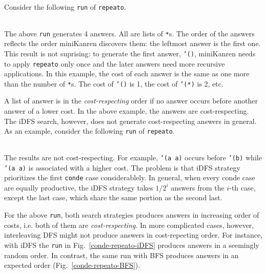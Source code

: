 \documentclass[format=acmlarge, review=true, authordraft=true]{acmart}
\begin{document}
Consider the following \texttt{run} of \texttt{repeato}.
\begin{center}
  \begin{tabular}{c}
  
   \end{tabular}
\end{center}

The above \texttt{run} generates 4 answers. All are lists of \texttt{*}s.
The order of the answers reflects the order miniKanren discovers them:
the leftmost answer is the first one. This result is not suprising:
to generate the first answer, \texttt{'()}, miniKanren needs to apply
\texttt{repeato} only once and the later answers need more recursive
applications. In this example, the cost of each answer is the same as
one more than the number of \texttt{*}s. The cost of \texttt{'()} is 1,
the cost of \texttt{'(*)} is 2, etc.

A list of answer is in the \emph{cost-respecting} order if no answer occurs
before another answer of a lower cost. In the above example, the answers are
cost-respecting. The iDFS search, however, does not generate cost-respecting
answers in general. As an example, consider the following \texttt{run} of
\texttt{repeato}.
\begin{center}
  \begin{tabular}{c}
   
   \end{tabular}
\end{center}

The results are not cost-respecting. For example, \texttt{'(a a)} occurs before
\texttt{'(b)} while \texttt{'(a a)} is associated with a higher cost. 
The problem is that iDFS strategy prioritizes the first \texttt{conde} case
considerablely. In general, when every conde case are equally productive, the iDFS
strategy takes $1/2^{i}$ answers from the $i$-th case, except the last case,
which share the same portion as the second last.




For the above \texttt{run}, both search strategies produces answers in increasing order of costs, i.e. both of them are \emph{cost-respecting}. In more complicated cases, however, interleaving DFS might not produce answers in cost-repecting order. For instance, with iDFS the \texttt{run} in Fig.~\ref{conde-repeato-iDFS} produces answers in a seemingly random order. In contrast, the same run with BFS produces answers in an expected order (Fig.~\ref{conde-repeato-BFS}).
\end{document}
